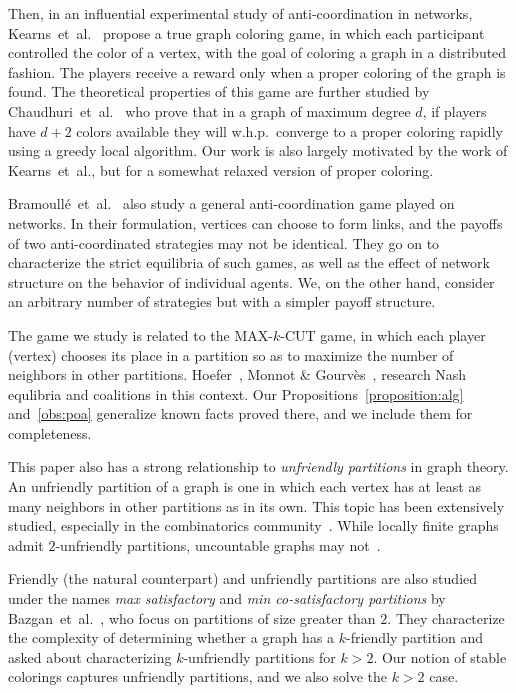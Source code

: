 Then, in an influential experimental study of anti-coordination in networks,
Kearns~et~al.~\cite{KearnsSM06} propose a true graph coloring game, in which
each participant controlled the color of a vertex, with the goal of coloring a
graph in a distributed fashion.  The players receive a reward only when a
proper coloring of the graph is found.  The theoretical properties of this game
are further studied by Chaudhuri~et~al.~\cite{ChaudhuriGJ08} who prove that in
a graph of maximum degree $d$, if players have $d + 2$ colors available they
will w.h.p.\ converge to a proper coloring rapidly using a greedy local
algorithm.  Our work is also largely motivated by the work of Kearns~et~al.,
but for a somewhat relaxed version of proper coloring.

Bramoull\'{e}~et~al.~\cite{BramoulleLGV04} also study a general
anti-coordination game played on networks.  In their formulation, vertices can
choose to form links, and the payoffs of two anti-coordinated strategies may
not be identical.  They go on to characterize the strict equilibria of such
games, as well as the effect of network structure on the behavior of individual
agents.  We, on the other hand, consider an arbitrary number of strategies but
with a simpler payoff structure.

The game we study is related to the MAX-$k$-CUT game, in which each player
(vertex) chooses its place in a partition so as to maximize the number of
neighbors in other partitions. Hoefer~\cite{Hoefer2007}, Monnot \&
Gourv\`es~\cite{G09}, research Nash equlibria and coalitions in this context.
Our Propositions~\ref{proposition:alg} and~\ref{obs:poa} generalize known facts
proved there, and we include them for completeness.

This paper also has a strong relationship to \emph{unfriendly partitions} in
graph theory.  An unfriendly partition of a graph is one in which each vertex
has at least as many neighbors in other partitions as in its own.  This topic
has been extensively studied, especially in the combinatorics
community~\cite{AharoniMP90,BruhnDGS10,ShelahM90}.  While locally finite graphs
admit $2$-unfriendly partitions, uncountable graphs may not~\cite{ShelahM90}.

Friendly (the natural counterpart) and unfriendly partitions are also studied
under the names \emph{max satisfactory} and \emph{min co-satisfactory
partitions} by Bazgan~et~al.~\cite{BazganTV10}, who focus on partitions of
size greater than $2$.  They characterize the complexity of determining
whether a graph has a $k$-friendly partition and asked about characterizing
$k$-unfriendly partitions for $k > 2$.  Our notion of stable colorings captures
unfriendly partitions, and we also solve the $k>2$ case.

